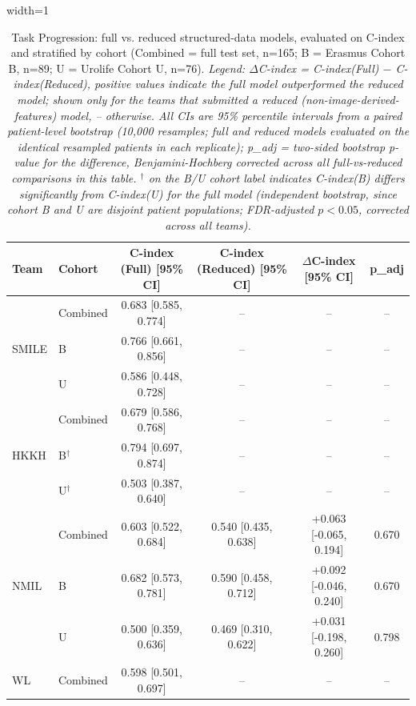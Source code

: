\begin{table}[H]
  \centering
  \caption{Task Progression: full vs. reduced structured-data models, evaluated on C-index and stratified by cohort (Combined = full test set, n=165; B = Erasmus Cohort B, n=89; U = Urolife Cohort U, n=76). \textit{Legend: $\Delta$C-index = C-index(Full) $-$ C-index(Reduced), positive values indicate the full model outperformed the reduced model; shown only for the teams that submitted a reduced (non-image-derived-features) model, -- otherwise. All CIs are 95\% percentile intervals from a paired patient-level bootstrap (10,000 resamples; full and reduced models evaluated on the identical resampled patients in each replicate); p\_adj = two-sided bootstrap p-value for the difference, Benjamini-Hochberg corrected across all full-vs-reduced comparisons in this table. $^{\dagger}$ on the B/U cohort label indicates C-index(B) differs significantly from C-index(U) for the full model (independent bootstrap, since cohort B and U are disjoint patient populations; FDR-adjusted $p<0.05$, corrected across all teams).}}
  \begin{adjustbox}{width=1\textwidth}
  \begin{tabular}{llcccc}
  \textbf{Team} & \textbf{Cohort} & \textbf{C-index (Full) [95\% CI]} & \textbf{C-index (Reduced) [95\% CI]} & \textbf{$\Delta$C-index [95\% CI]} & \textbf{p\_adj} \\
  \hline
  \multirow{3}{*}{SMILE} & Combined & 0.683 [0.585, 0.774] & -- & -- & -- \\
   & B & 0.766 [0.661, 0.856] & -- & -- & -- \\
   & U & 0.586 [0.448, 0.728] & -- & -- & -- \\
  \hline
  \multirow{3}{*}{HKKH} & Combined & 0.679 [0.586, 0.768] & -- & -- & -- \\
   & B$^{\dagger}$ & 0.794 [0.697, 0.874] & -- & -- & -- \\
   & U$^{\dagger}$ & 0.503 [0.387, 0.640] & -- & -- & -- \\
  \hline
  \multirow{3}{*}{NMIL} & Combined & 0.603 [0.522, 0.684] & 0.540 [0.435, 0.638] & +0.063 [-0.065, 0.194] & 0.670 \\
   & B & 0.682 [0.573, 0.781] & 0.590 [0.458, 0.712] & +0.092 [-0.046, 0.240] & 0.670 \\
   & U & 0.500 [0.359, 0.636] & 0.469 [0.310, 0.622] & +0.031 [-0.198, 0.260] & 0.798 \\
  \hline
  \multirow{3}{*}{WL} & Combined & 0.598 [0.501, 0.697] & -- & -- & -- \\

\end{tabular}
\end{adjustbox}
\end{table}
